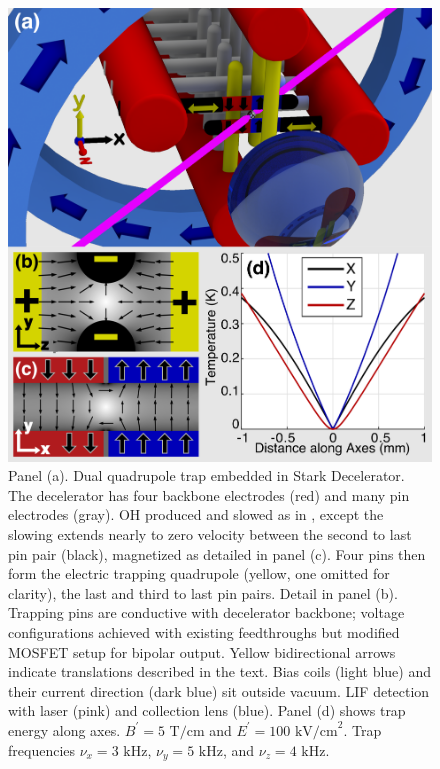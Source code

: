 \documentclass[%
 reprint,
groupedaddress,
 amsmath,amssymb,
 aps,
prl,
]{revtex4-1}
\begin{document}
\begin{figure}[tb]
\includegraphics[width=\linewidth]{Geometry/CAD_recolor_laser_panels.PNG}%
\caption{
Panel (a). Dual quadrupole trap embedded in Stark Decelerator. The decelerator has four backbone electrodes (red) and many pin electrodes (gray). OH produced and slowed as in \cite{Sawyer2008}, except the slowing extends nearly to zero velocity between the second to last pin pair (black), magnetized as detailed in panel (c). Four pins then form the electric trapping quadrupole (yellow, one omitted for clarity), the last and third to last pin pairs. Detail in panel (b). Trapping pins are conductive with decelerator backbone; voltage configurations achieved with existing feedthroughs but modified MOSFET setup for bipolar output. Yellow bidirectional arrows indicate translations described in the text. Bias coils (light blue) and their current direction (dark blue) sit outside vacuum. LIF detection with laser (pink) and collection lens (blue). Panel (d) shows trap energy along axes. $B^\prime=5\text{ T/cm}$ and $E^\prime=100 \text{ kV/cm}^2$. Trap frequencies $\nu_x=3\text{ kHz}$, $\nu_y=5\text{ kHz}$, and $\nu_z=4\text{ kHz}$.\label{fig:CAD}}
\end{figure}
\end{document}
